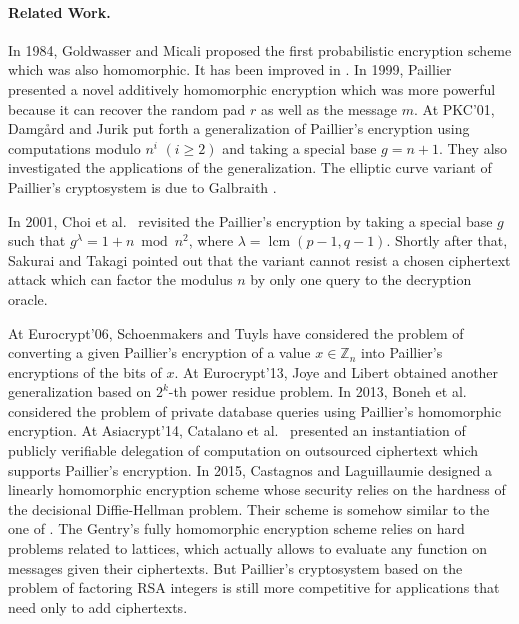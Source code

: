 \documentclass[11pt,a4paper]{article}
\theoremstyle{remark}
\newcommand{\Z}{\mathbb{Z}}
\newcommand{\lcm}{\operatorname{lcm}}
\begin{document}
\paragraph{Related Work.} In 1984, Goldwasser and Micali \cite{GM84} proposed the first probabilistic encryption scheme which was also homomorphic. It has been improved in \cite{NS98,OU98}. In 1999, Paillier \cite{Pai99} presented a novel additively homomorphic encryption which was more powerful because it can recover the random pad $r$ as well as the message $m$. At PKC'01, Damg{\aa}rd and Jurik \cite{DJ01} put forth a generalization of Paillier's encryption using computations modulo $n^i$ $(i\ge 2)$ and taking a special base $g=n+1$. They \cite{DJN10} also investigated the applications of the generalization. The elliptic curve variant of Paillier's cryptosystem is due to Galbraith \cite{Gal02}.

In 2001, Choi et al.\ \cite{CCW01} revisited the Paillier's encryption by taking a special base $g$ such that $g^\lambda = 1+n \bmod n^2$, where $\lambda=\lcm(p-1,q-1)$. Shortly after that, Sakurai and Takagi \cite{ST02} pointed out that the variant cannot resist a chosen ciphertext attack which can factor the modulus $n$ by only one query to the decryption oracle.

At Eurocrypt'06, Schoenmakers and Tuyls \cite{ST06} have considered the problem of converting a given Paillier's encryption of a value $x\in\Z_n$ into Paillier's encryptions of the bits of $x$. At Eurocrypt'13, Joye and Libert \cite{JL13} obtained another generalization based on $2^k$-th power residue problem. In 2013, Boneh et al.\ \cite{BGHWW13} considered the problem of private database queries using Paillier's homomorphic encryption. At Asiacrypt'14, Catalano et al.\ \cite{CMP14} presented an instantiation of publicly verifiable delegation of computation on outsourced ciphertext which supports Paillier's encryption. In 2015, Castagnos and Laguillaumie \cite{CL15} designed a linearly homomorphic encryption scheme whose security relies on the hardness of the decisional Diffie-Hellman problem. Their scheme is somehow similar to the one of \cite{BCP03}. The Gentry's fully homomorphic encryption scheme \cite{Gen09} relies on hard problems related to lattices, which actually allows to evaluate any function on messages given their ciphertexts. But Paillier's cryptosystem based on the problem of factoring RSA integers is still more competitive for applications that need only to add ciphertexts.
\end{document}
